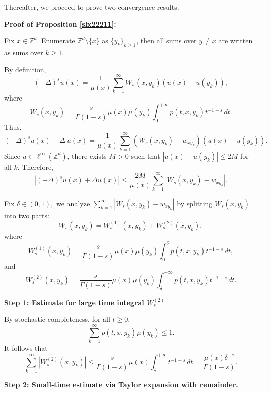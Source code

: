 \documentclass[reqno,12pt]{amsart}
\numberwithin{equation}{section}
\begin{document}
Thereafter, we proceed to prove two convergence results.

	\vspace{1\baselineskip}
	
\noindent \textbf{Proof of Proposition \ref{slx22211}:}

	Fix \(x\in \mathbb{Z}^d\). Enumerate \(\mathbb{Z}^d \setminus \{x\}\) as \(\{y_k\}_{k\geq 1}\), then all sums over \(y\neq x\) are written as sums over \(k\geq 1\).
	
	By definition,
	\[
	(-\Delta)^s u(x) = \frac{1}{\mu(x)} \sum_{k=1}^{\infty} W_s(x,y_k) (u(x) - u(y_k)),
	\]
	where
	\[
	W_s(x,y_k) = \frac{s}{\Gamma(1-s)} \mu(x)\mu(y_k) \int_0^{+\infty} p(t,x,y_k)t^{-1-s}\,dt.
	\]
	Thus,
	\[
	(-\Delta)^s u(x) + \Delta\: u(x) = \frac{1}{\mu(x)} \sum_{k=1}^{\infty} (W_s(x,y_k) - w_{xy_k})(u(x) - u(y_k)).
	\]
	Since \(u \in \ell^\infty(\mathbb{Z}^d)\), there exists \(M>0\) such that \(|u(x) - u(y_k)| \leq 2M\) for all \(k\).  
	Therefore,
	\[
	\left| (-\Delta)^s u(x) + \Delta u(x) \right| \leq \frac{2M}{\mu(x)} \sum_{k=1}^{\infty} \left|W_s(x,y_k) - w_{xy_k}\right|.
	\]
	
	Fix $\delta\in (0,1),$ we analyze \(\sum_{k=1}^{\infty} \left| W_s(x,y_k) - w_{xy_k} \right|\) by splitting \(W_s(x,y_k)\) into two parts:
	\[
	W_s(x,y_k) = W_s^{(1)}(x,y_k) + W_s^{(2)}(x,y_k),
	\]
	where
	\[
	W_s^{(1)}(x,y_k) = \frac{s}{\Gamma(1-s)} \mu(x)\mu(y_k) \int_0^\delta p(t,x,y_k)t^{-1-s}\,dt,\]
	and
	\[	W_s^{(2)}(x,y_k) = \frac{s}{\Gamma(1-s)} \mu(x)\mu(y_k) \int_\delta^{+\infty} p(t,x,y_k)t^{-1-s}\,dt.
	\]
	
	\noindent
	\textbf{Step 1: Estimate for large time integral $W_s^{(2)}$}
	
	By stochastic completeness, for all \(t\geq 0\),
	\[
	\sum_{k=1}^{\infty} p(t,x,y_k) \mu(y_k) \leq 1.
	\]
	It follows that
	\[
	\sum_{k=1}^{\infty} |W_s^{(2)}(x,y_k)| \leq \frac{s}{\Gamma(1-s)} \mu(x) \int_\delta^{+\infty} t^{-1-s}\,dt=\frac{\mu(x)\delta^{-s}}{\Gamma(1-s)}.
	\]
	
	
	\medskip
	
	\noindent\textbf{Step 2: Small‐time estimate via Taylor expansion with remainder.}
	
\end{document}
